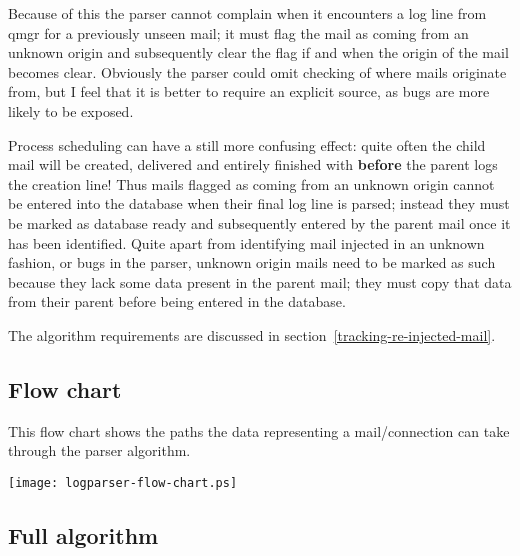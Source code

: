 \documentclass[a4paper,12pt,draft]{article}
\begin{document}
\begin{enumerate}
        Because of this the parser cannot complain when it encounters a log
        line from qmgr for a previously unseen mail; it must flag the mail
        as coming from an unknown origin and subsequently clear the flag if and
        when the origin of the mail becomes clear.  Obviously the parser
        could omit checking of where mails originate from, but I feel that
        it is better to require an explicit source, as bugs are more likely
        to be exposed.

        Process scheduling can have a still more confusing effect: quite
        often the child mail will be created, delivered and entirely
        finished with \textbf{before} the parent logs the creation line!
        Thus mails flagged as coming from an unknown origin cannot be
        entered into the database when their final log line is parsed;
        instead they must be marked as database ready and subsequently
        entered by the parent mail once it has been identified.  Quite
        apart from identifying mail injected in an unknown fashion, or bugs
        in the parser, unknown origin mails need to be marked as such
        because they lack some data present in the parent mail; they must
        copy that data from their parent before being entered in the
        database.

        The algorithm requirements are discussed in
        section~\ref{tracking-re-injected-mail}.


\end{enumerate}

\newpage
\subsection{Flow chart}

\label{flow-chart}

This flow chart shows the paths the data representing a mail/connection can
take through the parser algorithm.

\texttt{[image: logparser-flow-chart.ps]}

\subsection{Full algorithm}

\label{full-algorithm}
\end{document}
